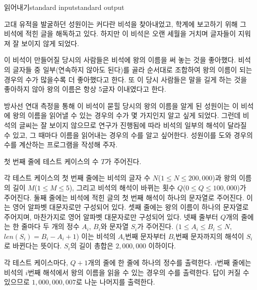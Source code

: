 \begin{problem}{읽어내기}{standard input}{standard output}

고대 유적을 발굴하던 성원이는 커다란 비석을 찾아내었고, 학계에 보고하기 위해 그 비석에 적힌 글을 해독하고 있다. 하지만 이 비석은 오랜 세월을 거치며 글자들이 지워져 잘 보이지 않게 되었다.

이 비석이 만들어질 당시의 사람들은 비석에 왕의 이름을 써 놓는 것을 좋아했다. 비석의 글자들 중 일부(연속하지 않아도 된다)를 골라 순서대로 조합하여 왕의 이름이 되는 경우의 수가 많을수록 더 좋아했다고 한다. 또 이 당시 사람들은 말을 길게 하는 것을 좋아하지 않아 왕의 이름은 항상 5글자 이내였다고 한다.

방사선 연대 측정을 통해 이 비석이 묻힐 당시의 왕의 이름을 알게 된 성원이는 이 비석에 왕의 이름을 읽어낼 수 있는 경우의 수가 몇 가지인지 알고 싶게 되었다. 그런데 비석의 글씨는 잘 보이지 않으므로 연구가 진행됨에 따라 비석의 일부의 해석이 달라질 수 있고, 그 때마다 이름을 읽어내는 경우의 수를 알고 싶어한다. 성원이를 도와 경우의 수를 계산하는 프로그램을 작성해 주자.

\InputFile
첫 번째 줄에 테스트 케이스의 수 $T$가 주어진다.

각 테스트 케이스의 첫 번째 줄에는 비석의 글자 수 $N$($1 \le N \le 200,000$)과 왕의 이름의 길이 $M$($1 \le M \le 5$), 그리고 비석의 해석이 바뀌는 횟수 $Q$($0 \le Q \le 100,000$)가 주어진다. 둘째 줄에는 비석에 적힌 글의 첫 번째 해석이 하나의 문자열로 주어진다. 이는 영어 알파벳 대문자로만 구성되어 있다. 셋째 줄에는 왕의 이름이 하나의 문자열로 주어지며, 마찬가지로 영어 알파벳 대문자로만 구성되어 있다. 넷째 줄부터 $Q$개의 줄에는 한 줄마다 두 개의 정수 $A_i$, $B_i$와 문자열 $S_i$가 주어진다. ($1 \le A_i \le B_i \le N$, $len( S_i ) = B_i - A_i + 1$) 이는 비석의 $A_i$번째 문자부터 $B_i$번째 문자까지의 해석이 $S_i$로 바뀐다는 뜻이다. $S_i$의 길이 총합은 $2,000,000$ 이하이다.

\OutputFile
각 테스트 케이스마다, $Q+1$개의 줄에 한 줄에 하나의 정수를 출력한다. $i$번째 줄에는 비석의 $i$번째 해석에서 왕의 이름을 읽을 수 있는 경우의 수를 출력한다. 답이 커질 수 있으므로 $1,000,000,007$로 나눈 나머지를 출력한다.

\Example

\begin{example}
%
\end{example}

\end{problem}
